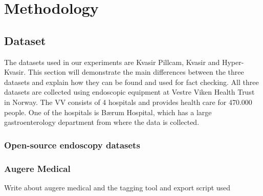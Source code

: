 \documentclass[thesis.tex]{subfiles}
\begin{document}
\chapter{Methodology} \label{chap:methodology}


\section{Dataset} \label{sec:data_collection}

The datasets used in our experiments are Kvasir Pillcam, Kvasir and Hyper-Kvasir. This section will demonstrate the main differences between the three datasets and explain how they can be found and used for fact checking. All three datasets are collected using endoscopic equipment at Vestre Viken Health Trust in Norway. The VV consists of 4 hospitals and provides health care for 470.000 people. One of the hospitals is Bærum Hospital, which has a large gastroenterology department from where the data is collected. 



\subsection{Open-source endoscopy datasets}


\subsection{Augere Medical}
Write about augere medical and the tagging tool and export script used
\end{document}
